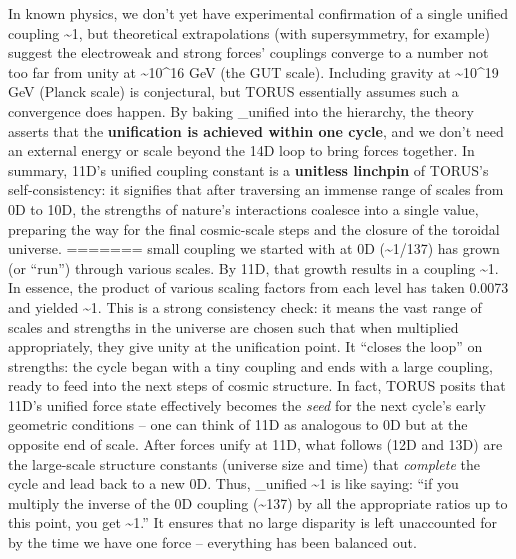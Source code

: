 \documentclass[]{article}
\begin{document}
In known physics, we don't yet have experimental confirmation of a
single unified coupling \textasciitilde1, but theoretical extrapolations
(with supersymmetry, for example) suggest the electroweak and strong
forces' couplings converge to a number not too far from unity at
\textasciitilde10\^{}16 GeV (the GUT scale)\hspace{0pt}. Including
gravity at \textasciitilde10\^{}19 GeV (Planck scale) is conjectural,
but TORUS essentially assumes such a convergence does happen. By baking
\alpha\_unified  into the hierarchy, the theory asserts that the
\textbf{unification is achieved within one cycle}, and we don't need an
external energy or scale beyond the 14D loop to bring forces together.
In summary, 11D's unified coupling constant is a \textbf{unitless
linchpin} of TORUS's self-consistency: it signifies that after
traversing an immense range of scales from 0D to 10D, the strengths of
nature's interactions coalesce into a single value, preparing the way
for the final cosmic-scale steps and the closure of the toroidal
universe.
=======
small coupling we started with at 0D (\alpha \textasciitilde{}1/137) has
grown (or ``run'') through various scales. By 11D, that growth results
in a coupling \textasciitilde{}1. In essence, the product of various
scaling factors from each level has taken 0.0073 and yielded
\textasciitilde{}1​. This is a strong consistency check: it means the
vast range of scales and strengths in the universe are chosen such that
when multiplied appropriately, they give unity at the unification point.
It ``closes the loop'' on strengths: the cycle began with a tiny
coupling and ends with a large coupling, ready to feed into the next
steps of cosmic structure​. In fact, TORUS posits that 11D's unified
force state effectively becomes the \emph{seed} for the next cycle's
early geometric conditions -- one can think of 11D as analogous to 0D
but at the opposite end of scale​. After forces unify at 11D, what
follows (12D and 13D) are the large-scale structure constants (universe
size and time) that \emph{complete} the cycle and lead back to a new 0D.
Thus, \alpha\_unified \textasciitilde{}1 is like saying: ``if you multiply
the inverse of the 0D coupling (\textasciitilde{}137) by all the
appropriate ratios up to this point, you get \textasciitilde{}1.'' It
ensures that no large disparity is left unaccounted for by the time we
have one force -- everything has been balanced out.
\end{document}
